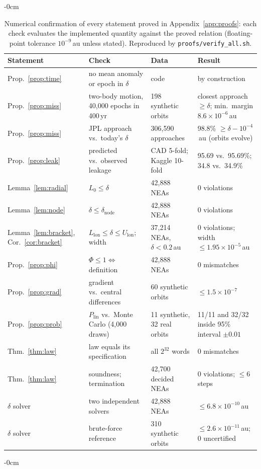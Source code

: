 \documentclass[make,article,submit,moreauthors]{Definitions/mdpi}
\begin{document}
\begin{table}[t]
\begin{adjustwidth}{-\extralength}{0cm}
\centering
\footnotesize
\caption{Numerical confirmation of every statement proved in Appendix~\ref{app:proofs}: each check evaluates the implemented quantity against the proved relation (floating-point tolerance $10^{-9}$\,au unless stated). Reproduced by \texttt{proofs/verify\_all.sh}.}
\label{tab:proofs}
\begin{tabularx}{\linewidth}{@{}>{\raggedright\arraybackslash}p{2.6cm}YYY@{}}
\toprule
Statement & Check & Data & Result \\
\midrule
Prop.~\ref{prop:time} & no mean anomaly or epoch in $\delta$ & code & by construction \\
Prop.~\ref{prop:miss} & two-body motion, 40,000 epochs in 400\,yr & 198 synthetic orbits & closest approach $\ge\delta$; min.\ margin $8.6\times10^{-6}$\,au \\
Prop.~\ref{prop:miss} & JPL approach vs.\ today's $\delta$ & 306,590 approaches & 98.8\% $\ge \delta - 10^{-4}$\,au (orbits evolve) \\
Prop.~\ref{prop:leak} & predicted vs.\ observed leakage & CAD 5-fold; Kaggle 10-fold & 95.69 vs.\ 95.69\%; 34.8 vs.\ 34.9\% \\
Lemma~\ref{lem:radial} & $L_0 \le \delta$ & 42,888 NEAs & 0 violations \\
Lemma~\ref{lem:node} & $\delta \le \delta_{\mathrm{node}}$ & 42,888 NEAs & 0 violations \\
Lemma~\ref{lem:bracket}, Cor.~\ref{cor:bracket} & $L_{\mathrm{lon}} \le \delta \le U_{\mathrm{lon}}$; width & 37,214 NEAs, $\delta < 0.2$\,au & 0 violations; width $\le 1.95\times10^{-5}$\,au \\
Prop.~\ref{prop:phi} & $\Phi \le 1 \Leftrightarrow$ definition & 42,888 NEAs & 0 mismatches \\
Prop.~\ref{prop:grad} & gradient vs.\ central differences & 60 synthetic orbits & $\le 1.5\times10^{-7}$ \\
Prop.~\ref{prop:prob} & $P_{\mathrm{lin}}$ vs.\ Monte Carlo (4,000 draws) & 11 synthetic, 32 real orbits & 11/11 and 32/32 inside 95\% interval $\pm0.01$ \\
Thm.~\ref{thm:law} & law equals its specification & all $2^{32}$ words & 0 mismatches \\
Thm.~\ref{thm:law} & soundness; termination & 42,700 decided NEAs & 0 violations; $\le 6$ steps \\
$\delta$ solver & two independent solvers & 42,888 NEAs & $\le 6.8\times10^{-10}$\,au \\
$\delta$ solver & brute-force reference & 310 synthetic orbits & $\le 2.6\times10^{-11}$\,au; 0 uncertified \\
\bottomrule
\end{tabularx}
\end{adjustwidth}
\end{table}



\begin{adjustwidth}{-\extralength}{0cm}

\PublishersNote{}
\end{adjustwidth}
\end{document}
